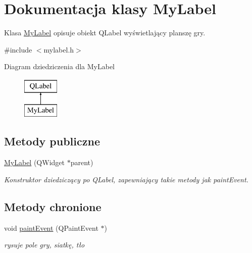 \hypertarget{classMyLabel}{}\section{Dokumentacja klasy My\+Label}
\label{classMyLabel}


Klasa \mbox{\hyperlink{classMyLabel}{My\+Label}} opisuje obiekt Q\+Label wyświetlający planszę gry.  




{\ttfamily \#include $<$mylabel.\+h$>$}

Diagram dziedziczenia dla My\+Label\begin{figure}[H]
\begin{center}
\leavevmode
\includegraphics[height=2.000000cm]{classMyLabel}
\end{center}
\end{figure}
\subsection*{Metody publiczne}
\begin{DoxyCompactItemize}
\item 
\mbox{\hyperlink{classMyLabel_a6dec17e950b87f0dbc72225cd7ae198f}{My\+Label}} (Q\+Widget $\ast$parent)
\begin{DoxyCompactList}\small\item\em Konstruktor dziedziczący po Q\+Label, zapewniający takie metody jak paint\+Event. \end{DoxyCompactList}\end{DoxyCompactItemize}
\subsection*{Metody chronione}
\begin{DoxyCompactItemize}
\item 
\mbox{\label{classMyLabel_a452ad360daf6eea910588e88edfa6a83}} 
void \mbox{\hyperlink{classMyLabel_a452ad360daf6eea910588e88edfa6a83}{paint\+Event}} (Q\+Paint\+Event $\ast$)
\begin{DoxyCompactList}\small\item\em rysuje pole gry, siatkę, tło \end{DoxyCompactList}\end{DoxyCompactItemize}


